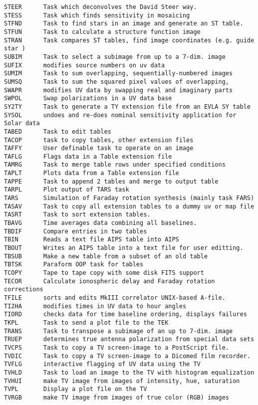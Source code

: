 \begin{verbatim}
STEER      Task which deconvolves the David Steer way.
STESS      Task which finds sensitivity in mosaicing
STFND      Task to find stars in an image and generate an ST table.
STFUN      Task to calculate a structure function image
STRAN      Task compares ST tables, find image coordinates (e.g. guide star )
SUBIM      Task to select a subimage from up to a 7-dim. image
SUFIX      modifies source numbers on uv data
SUMIM      Task to sum overlapping, sequentially-numbered images
SUMSQ      Task to sum the squared pixel values of overlapping,
SWAPR      modifies UV data by swapping real and imaginary parts
SWPOL      Swap polarizations in a UV data base
SY2TY      Task to generate a TY extension file from an EVLA SY table
SYSOL      undoes and re-does nominal sensitivity application for Solar data
TABED      Task to edit tables
TACOP      task to copy tables, other extension files
TAFFY      User definable task to operate on an image
TAFLG      Flags data in a Table extension file
TAMRG      Task to merge table rows under specified conditions
TAPLT      Plots data from a Table extension file
TAPPE      Task to append 2 tables and merge to output table
TARPL      Plot output of TARS task
TARS       Simulation of Faraday rotation synthesis (mainly task FARS)
TASAV      Task to copy all extension tables to a dummy uv or map file
TASRT      Task to sort extension tables.
TBAVG      Time averages data combining all baselines.
TBDIF      Compare entries in two tables
TBIN       Reads a text file AIPS table into AIPS
TBOUT      Writes an AIPS table into a text file for user editting.
TBSUB      Make a new table from a subset of an old table
TBTSK      Paraform OOP task for tables
TCOPY      Tape to tape copy with some disk FITS support
TECOR      Calculate ionospheric delay and Faraday rotation corrections
TFILE      sorts and edits MkIII correlator UNIX-based A-file.
TI2HA      modifies times in UV data to hour angles
TIORD      checks data for time baseline ordering, displays failures
TKPL       Task to send a plot file to the TEK
TRANS      Task to transpose a subimage of an up to 7-dim. image
TRUEP      determines true antenna polarization from special data sets
TVCPS      Task to copy a TV screen-image to a PostScript file.
TVDIC      Task to copy a TV screen-image to a Dicomed film recorder.
TVFLG      interactive flagging of UV data using the TV
TVHLD      Task to load an image to the TV with histogram equalization
TVHUI      make TV image from images of intensity, hue, saturation
TVPL       Display a plot file on the TV
TVRGB      make TV image from images of true color (RGB) images

\end{verbatim}

